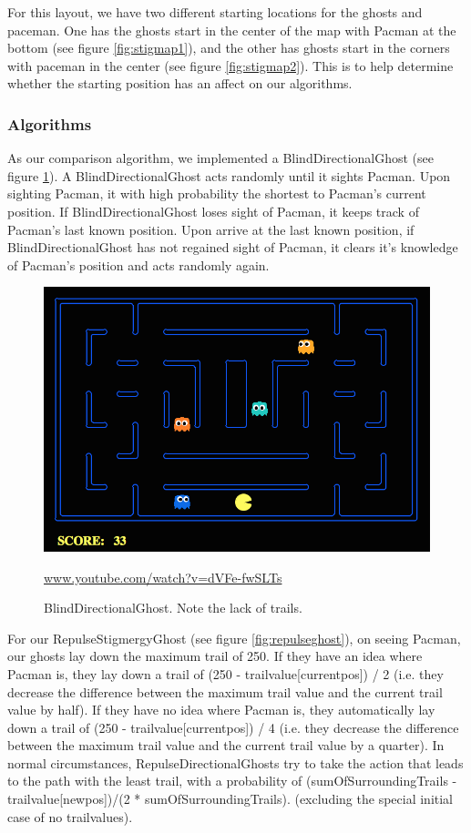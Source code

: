 \documentclass[11pt]{article}
\begin{document}
\begin{multicols}{2}
For this layout, we have two different starting locations for the ghosts and paceman.  One has the ghosts start in the center of the map with Pacman at the bottom (see figure \ref{fig:stigmap1}), and the other has ghosts start in the corners with paceman in the center (see figure \ref{fig:stigmap2}).  This is to help determine whether the starting position has an affect on our algorithms.




\subsubsection{Algorithms}

As our comparison algorithm, we implemented a BlindDirectionalGhost (see figure \ref{fig:blindghost}). A BlindDirectionalGhost acts randomly until it sights Pacman.  Upon sighting Pacman, it with high probability the shortest to Pacman's current position.  If BlindDirectionalGhost loses sight of Pacman, it keeps track of Pacman's last known position.  Upon arrive at the last known position, if BlindDirectionalGhost has not regained sight of Pacman, it clears it's knowledge of Pacman's position and acts randomly again.
\begin{figure}[H]
	\includegraphics[width=\columnwidth]{BlindDirectionalGhost.png}
	\caption{BlindDirectionalGhost. Note the lack of trails.}
 	\protect\url{www.youtube.com/watch?v=dVFe-fwSLTs} 
	\label{fig:blindghost}
\end{figure}

For our RepulseStigmergyGhost  (see figure \ref{fig:repulseghost}), on seeing Pacman, our ghosts lay down the maximum trail of 250.  If they have an idea where Pacman is, they lay down a trail of (250 - trailvalue[currentpos]) / 2 (i.e. they decrease the difference between the maximum trail value and the current trail value by half).   If they have no idea where Pacman is, they automatically lay down a trail of (250 - trailvalue[currentpos]) / 4 (i.e. they decrease the difference between the maximum trail value and the current trail value by a quarter). In normal circumstances, RepulseDirectionalGhosts try to take the action that leads to the path with the least trail, with a probability of (sumOfSurroundingTrails - trailvalue[newpos])/(2 * sumOfSurroundingTrails). (excluding the special initial case of no trailvalues).


\end{multicols}
\end{document}

